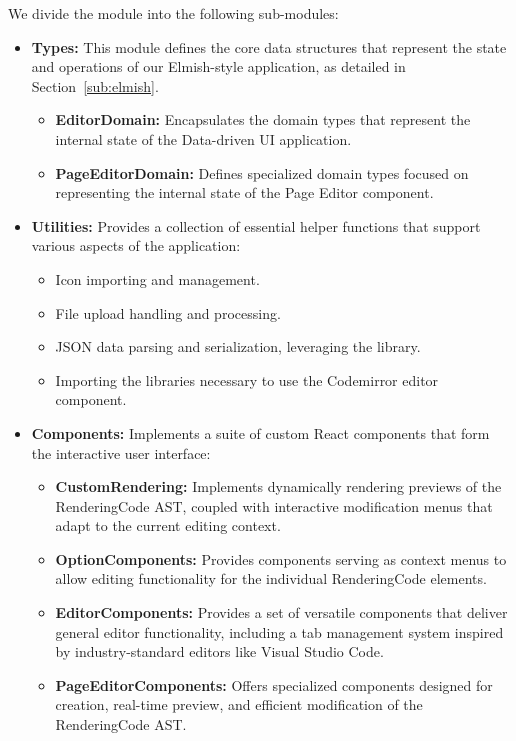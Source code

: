 We divide the module into the following sub-modules:
\begin{itemize}
	\item \textbf{Types:} This module defines the core data structures that represent the state and operations of our Elmish-style application, as detailed in Section~\ref{sub:elmish}.
	      \begin{itemize}
		      \item \textbf{EditorDomain:} Encapsulates the domain types that represent the internal state of the Data-driven UI application.
		      \item \textbf{PageEditorDomain:} Defines specialized domain types focused on representing the internal state of the Page Editor component.
	      \end{itemize}

	\item \textbf{Utilities:} Provides a collection of essential helper functions that support various aspects of the application:
	      \begin{itemize}
		      \item Icon importing and management.
		      \item File upload handling and processing.
		      \item JSON data parsing and serialization, leveraging the \citet{simpleJson} library.
		      \item Importing the libraries necessary to use the Codemirror editor component.
	      \end{itemize}


	\item \textbf{Components:} Implements a suite of custom React components that form the interactive user interface:
	      \begin{itemize}
		      \item \textbf{CustomRendering:} Implements dynamically rendering previews of the RenderingCode AST, coupled with interactive modification menus that adapt to the current editing context.
		      \item \textbf{OptionComponents:} Provides components serving as context menus to allow editing functionality for the individual RenderingCode elements.
		      \item \textbf{EditorComponents:} Provides a set of versatile components that deliver general editor functionality, including a tab management system inspired by industry-standard editors like Visual Studio Code.
		      \item \textbf{PageEditorComponents:} Offers specialized components designed for creation, real-time preview, and efficient modification of the RenderingCode AST.
	      \end{itemize}
\end{itemize}



